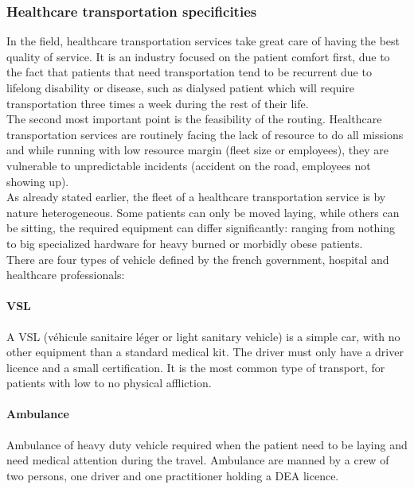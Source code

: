 \documentclass[12pt]{memoir}
\begin{document}

\subsubsection{Healthcare transportation specificities}
\label{sub:Healthcare transportation specificities}
In the field, healthcare transportation services take great care of having the best
quality of service. It is an industry focused on the patient comfort first, due to the
fact that patients that need transportation tend to be recurrent due to lifelong
disability or disease, such as dialysed patient which will require transportation three
times a week during the rest of their life. \\
The second most important point is the feasibility of the routing. Healthcare
transportation services are routinely facing the lack of resource to do all missions
and while running with low resource margin (fleet size or employees), they are
vulnerable to unpredictable incidents (accident on the road, employees not showing
up).\\

As already stated earlier, the fleet of a healthcare transportation service is by
nature heterogeneous. Some patients can only be moved laying, while others can be sitting,
the required equipment can differ significantly: ranging from nothing to big specialized
hardware for heavy burned or morbidly obese patients.\\
There are four types of vehicle defined by the french government, hospital and healthcare professionals:

\paragraph{VSL} %
\label{par:VSL}
A VSL (véhicule sanitaire léger or light sanitary vehicle) is a simple car, with no
other equipment than a standard medical kit. The driver must only have a driver
licence and a small certification. It is the most common type of transport, for
patients with low to no physical affliction.

\paragraph{Ambulance} %
\label{par:Ambulance}
Ambulance of heavy duty vehicle required when the patient need to be laying and need
medical attention during the travel. Ambulance are manned by a crew of two persons,
one driver and one practitioner holding a DEA licence.
\end{document}
